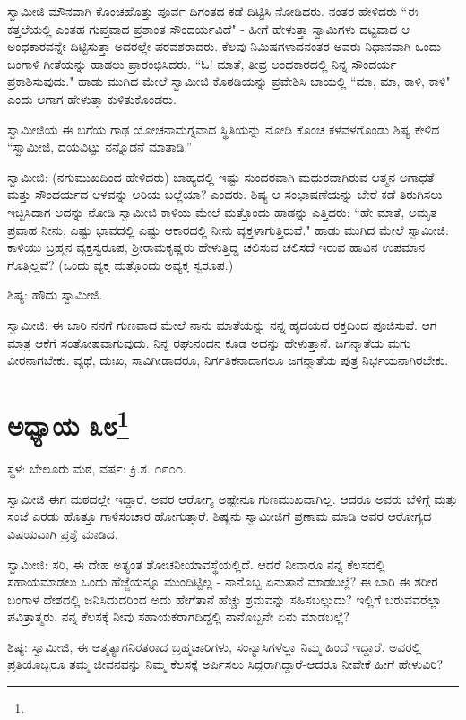 ಸ್ವಾಮೀಜಿ ಮೌನವಾಗಿ ಕೊಂಚಹೊತ್ತು ಪೂರ್ವ ದಿಗಂತದ ಕಡೆ ದಿಟ್ಟಿಸಿ ನೋಡಿದರು. ನಂತರ ಹೇಳಿದರು “ಈ ಕತ್ತಲೆಯಲ್ಲಿ ಎಂತಹ ಗುಪ್ತವಾದ ಪ್ರಶಾಂತ ಸೌಂದರ್ಯವಿದೆ" - ಹೀಗೆ ಹೇಳುತ್ತಾ ಸ್ವಾಮಿಗಳು ದಟ್ಟವಾದ ಆ ಅಂಧಕಾರವನ್ನೇ ದಿಟ್ಟಿಸುತ್ತಾ ಅದರಲ್ಲೇ ಪರವಶರಾದರು. ಕೆಲವು ನಿಮಿಷಗಳಾದನಂತರ ಅವರು ನಿಧಾನವಾಗಿ ಒಂದು ಬಂಗಾಳಿ ಗೀತೆಯನ್ನು ಹಾಡಲು ಪ್ರಾರಂಭಿಸಿದರು. “ಓ! ಮಾತೆ, ತೀವ್ರ ಅಂಧಕಾರದಲ್ಲಿ ನಿನ್ನ ಸೌಂದರ್ಯ ಪ್ರಕಾಶಿಸುವುದು." ಹಾಡು ಮುಗಿದ ಮೇಲೆ ಸ್ವಾಮೀಜಿ ಕೊಠಡಿಯನ್ನು ಪ್ರವೇಶಿಸಿ ಬಾಯಲ್ಲಿ “ಮಾ, ಮಾ, ಕಾಳಿ, ಕಾಳಿ" ಎಂದು ಆಗಾಗ ಹೇಳುತ್ತಾ ಕುಳಿತುಕೊಂಡರು.

ಸ್ವಾಮೀಜಿಯ ಈ ಬಗೆಯ ಗಾಢ ಯೋಚನಾಮಗ್ನವಾದ ಸ್ಥಿತಿಯನ್ನು ನೋಡಿ ಕೊಂಚ ಕಳವಳಗೊಂಡು ಶಿಷ್ಯ ಕೇಳಿದ “ಸ್ವಾಮೀಜಿ, ದಯವಿಟ್ಟು ನನ್ನೊಡನೆ ಮಾತಾಡಿ.”

ಸ್ವಾಮೀಜಿ: (ನಗುಮುಖದಿಂದ ಹೇಳಿದರು) ಬಾಹ್ಯದಲ್ಲಿ ಇಷ್ಟು ಸುಂದರವಾಗಿ ಮಧುರವಾಗಿರುವ ಆತ್ಮನ ಅಗಾಧತೆ ಮತ್ತು ಸೌಂದರ್ಯದ ಆಳವನ್ನು ಅರಿಯ ಬಲ್ಲೆಯಾ? ಎಂದರು. ಶಿಷ್ಯ ಆ ಸಂಭಾಷಣೆಯನ್ನು ಬೇರೆ ಕಡೆ ತಿರುಗಿಸಲು ಇಚ್ಛಿಸಿದಾಗ ಅದನ್ನು ನೋಡಿ ಸ್ವಾಮೀಜಿ ಕಾಳಿಯ ಮೇಲೆ ಮತ್ತೊಂದು ಹಾಡನ್ನು ಎತ್ತಿದರು: “ಹೇ ಮಾತೆ, ಅಮೃತ ಪ್ರವಾಹ ನೀನು, ಎಷ್ಟು ಭಾವದಲ್ಲಿ ಎಷ್ಟು ಆಕಾರದಲ್ಲಿ ನೀನು ವ್ಯಕ್ತಳಾಗುತ್ತಿರುವೆ." ಹಾಡು ಮುಗಿದ ಮೇಲೆ ಸ್ವಾಮೀಜಿ: ಕಾಳಿಯು ಬ್ರಹ್ಮನ ವ್ಯಕ್ತಸ್ವರೂಪ, ಶ‍್ರೀರಾಮಕೃಷ್ಣರು ಹೇಳುತ್ತಿದ್ದ ಚಲಿಸುವ ಚಲಿಸದೆ ಇರುವ ಹಾವಿನ ಉಪಮಾನ ಗೊತ್ತಿಲ್ಲವೆ? (ಒಂದು ವ್ಯಕ್ತ ಮತ್ತೊಂದು ಅವ್ಯಕ್ತ ಸ್ವರೂಪ.)

ಶಿಷ್ಯ: ಹೌದು ಸ್ವಾಮೀಜಿ.

ಸ್ವಾಮೀಜಿ: ಈ ಬಾರಿ ನನಗೆ ಗುಣವಾದ ಮೇಲೆ ನಾನು ಮಾತೆಯನ್ನು ನನ್ನ ಹೃದಯದ ರಕ್ತದಿಂದ ಪೂಜಿಸುವೆ. ಆಗ ಮಾತ್ರ ಆಕೆಗೆ ಸಂತೋಷವಾಗುವುದು. ನಿನ್ನ ರಘುನಂದನ ಕೂಡ ಅದನ್ನು ಹೇಳುತ್ತಾನೆ. ಜಗನ್ಮಾತೆಯ ಮಗು ವೀರನಾಗಬೇಕು. ವ್ಯಥೆ, ದುಃಖ, ಸಾವಿಗೀಡಾದರೂ, ನಿರ್ಗತಿಕನಾದಾಗಲೂ ಜಗನ್ಮಾತೆಯ ಪುತ್ರ ನಿರ್ಭಯನಾಗಿರಬೇಕು.

\newpage

\chapter[ಅಧ್ಯಾಯ ೩೮]{ಅಧ್ಯಾಯ ೩೮\protect\footnote{}}

\centerline{ಸ್ಥಳ: ಬೇಲೂರು ಮಠ, ವರ್ಷ: ಕ್ರಿ.ಶ. ೧೯೦೧.}

ಸ್ವಾಮೀಜಿ ಈಗ ಮಠದಲ್ಲೇ ಇದ್ದಾರೆ. ಅವರ ಆರೋಗ್ಯ ಅಷ್ಟೇನೂ ಗುಣಮುಖವಾಗಿಲ್ಲ. ಆದರೂ ಅವರು ಬೆಳಿಗ್ಗೆ ಮತ್ತು ಸಂಜೆ ಎರಡು ಹೊತ್ತೂ ಗಾಳಿಸಂಚಾರ ಹೋಗುತ್ತಾರೆ. ಶಿಷ್ಯನು ಸ್ವಾಮೀಜಿಗೆ ಪ್ರಣಾಮ ಮಾಡಿ ಅವರ ಆರೋಗ್ಯದ ವಿಷಯವಾಗಿ ಪ್ರಶ್ನೆ ಮಾಡಿದ.

ಸ್ವಾಮೀಜಿ: ಸರಿ, ಈ ದೇಹ ಅತ್ಯಂತ ಶೋಚನೀಯಾವಸ್ಥೆಯಲ್ಲಿದೆ. ಆದರೆ ನೀವಾರೂ ನನ್ನ ಕೆಲಸದಲ್ಲಿ ಸಹಾಯಮಾಡಲು ಒಂದು ಹೆಜ್ಜೆಯನ್ನೂ ಮುಂದಿಟ್ಟಿಲ್ಲ - ನಾನೊಬ್ಬ ಏನುತಾನೆ ಮಾಡಬಲ್ಲೆ? ಈ ಬಾರಿ ಈ ಶರೀರ ಬಂಗಾಳ ದೇಶದಲ್ಲಿ ಜನಿಸಿದುದರಿಂದ ಅದು ಹೇಗೆತಾನೆ ಹೆಚ್ಚು ಶ್ರಮವನ್ನು ಸಹಿಸಬಲ್ಲುದು? ಇಲ್ಲಿಗೆ ಬರುವವರೆಲ್ಲಾ ಪವಿತ್ರಾತ್ಮರು. ನನ್ನ ಕೆಲಸಕ್ಕೆ ನೀವು ಸಹಾಯಕರಾಗದಿದ್ದಲ್ಲಿ ನಾನೊಬ್ಬನೇ ಏನು ಮಾಡಬಲ್ಲೆ?

ಶಿಷ್ಯ: ಸ್ವಾಮೀಜಿ, ಈ ಆತ್ಮತ್ಯಾಗನಿರತರಾದ ಬ್ರಹ್ಮಚಾರಿಗಳು, ಸಂನ್ಯಾಸಿಗಳೆಲ್ಲಾ ನಿಮ್ಮ ಹಿಂದೆ ಇದ್ದಾರೆ. ಅವರಲ್ಲಿ ಪ್ರತಿಯೊಬ್ಬರೂ ತಮ್ಮ ಜೀವನವನ್ನು ನಿಮ್ಮ ಕೆಲಸಕ್ಕೆ ಅರ್ಪಿಸಲು ಸಿದ್ದರಾಗಿದ್ದಾರೆ-ಆದರೂ ನೀವೇಕೆ ಹೀಗೆ ಹೇಳುವಿರಿ?

